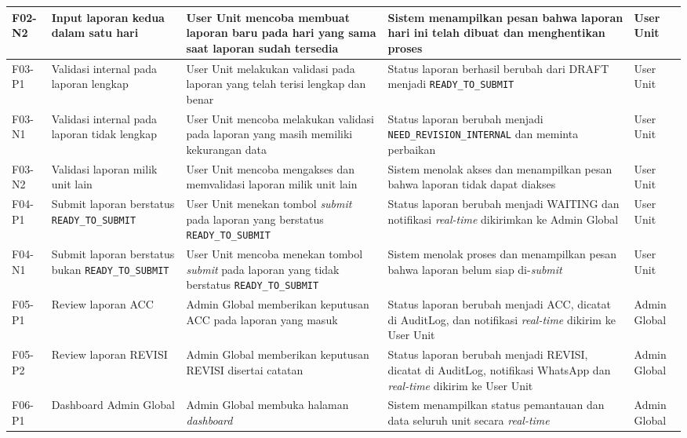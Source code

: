 \begin{longtable}{|p{}|p{}|p{}|p{}|p{}|}
    \hline
    F02-N2 & Input laporan kedua dalam satu hari & User Unit mencoba membuat laporan baru pada hari yang sama saat laporan sudah tersedia & Sistem menampilkan pesan bahwa laporan hari ini telah dibuat dan menghentikan proses & User Unit \\
    \hline
    F03-P1 & Validasi internal pada laporan lengkap & User Unit melakukan validasi pada laporan yang telah terisi lengkap dan benar & Status laporan berhasil berubah dari DRAFT menjadi \texttt{READY\allowbreak\_TO\allowbreak\_SUBMIT} & User Unit \\
    \hline
    F03-N1 & Validasi internal pada laporan tidak lengkap & User Unit mencoba melakukan validasi pada laporan yang masih memiliki kekurangan data & Status laporan berubah menjadi \texttt{NEED\allowbreak\_REVISION\allowbreak\_INTERNAL} dan meminta perbaikan & User Unit \\
    \hline
    F03-N2 & Validasi laporan milik unit lain & User Unit mencoba mengakses dan memvalidasi laporan milik unit lain & Sistem menolak akses dan menampilkan pesan bahwa laporan tidak dapat diakses & User Unit \\
    \hline
    F04-P1 & Submit laporan berstatus \texttt{READY\allowbreak\_TO\allowbreak\_SUBMIT} & User Unit menekan tombol \textit{submit} pada laporan yang berstatus \texttt{READY\allowbreak\_TO\allowbreak\_SUBMIT} & Status laporan berubah menjadi WAITING dan notifikasi \textit{real-time} dikirimkan ke Admin Global & User Unit \\
    \hline
    F04-N1 & Submit laporan berstatus bukan \texttt{READY\allowbreak\_TO\allowbreak\_SUBMIT} & User Unit mencoba menekan tombol \textit{submit} pada laporan yang tidak berstatus \texttt{READY\allowbreak\_TO\allowbreak\_SUBMIT} & Sistem menolak proses dan menampilkan pesan bahwa laporan belum siap di-\textit{submit} & User Unit \\
    \hline
    F05-P1 & Review laporan ACC & Admin Global memberikan keputusan ACC pada laporan yang masuk & Status laporan berubah menjadi ACC, dicatat di AuditLog, dan notifikasi \textit{real-time} dikirim ke User Unit & Admin Global \\
    \hline
    F05-P2 & Review laporan REVISI & Admin Global memberikan keputusan REVISI disertai catatan & Status laporan berubah menjadi REVISI, dicatat di AuditLog, notifikasi WhatsApp dan \textit{real-time} dikirim ke User Unit & Admin Global \\
    \hline
    F06-P1 & Dashboard Admin Global & Admin Global membuka halaman \textit{dashboard} & Sistem menampilkan status pemantauan dan data seluruh unit secara \textit{real-time} & Admin Global \\

\end{longtable}
